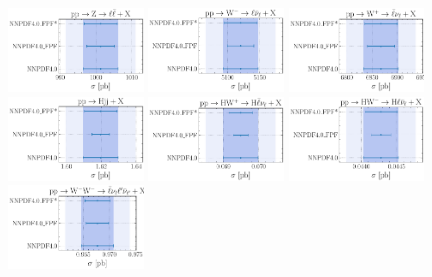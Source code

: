 \begin{figure}[htbp]
\centering
\includegraphics[width=0.32\textwidth]{plots/LHCpheno/NNPDF_DY_14TEV_40_PHENO-integrated.pdf}
\includegraphics[width=0.32\textwidth]{plots/LHCpheno/NNPDF_WM_14TEV_40_PHENO-integrated.pdf}
\includegraphics[width=0.32\textwidth]{plots/LHCpheno/NNPDF_WP_14TEV_40_PHENO-integrated.pdf}
\includegraphics[width=0.32\textwidth]{plots/LHCpheno/NNPDF_HVBF_14TEV_40_PHENO-integrated.pdf}
\includegraphics[width=0.32\textwidth]{plots/LHCpheno/NNPDF_HWP_14TEV_40_PHENO-integrated.pdf}
\includegraphics[width=0.32\textwidth]{plots/LHCpheno/NNPDF_HWM_14TEV_40_PHENO-integrated.pdf}
\includegraphics[width=0.32\textwidth]{plots/LHCpheno/NNPDF_WPWM_14TEV_40_PHENO-integrated.pdf}

\end{figure}
